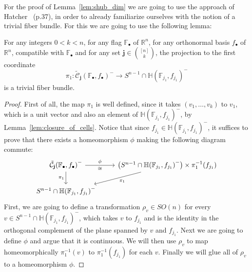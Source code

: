 For the proof of Lemma~\ref{lem:shub_dim} we are going to use the approach of Hatcher~\cite{vec_bundles} (p.37), in order to already familiarize ourselves with the notion of a trivial fiber bundle. For this we are going to use the following lemma:
\begin{lemma}\label{lem:trivial_fb} For any integers $0<k<n$, for any flag $\mathbb{F}_{\bullet}$ of $\mathbb{R}^n$, for any orthonormal basis $f_{\bullet}$ of $\mathbb{R}^n$, compatible with $\mathbb{F}_{\bullet}$ and for any set $\mathbf{j}\in\binom{[n]}{k}$, the projection to the first coordinate
\[\pi_1:\tilde{\mathcal{C}}_{\mathbf{j}}{\left(\mathbb{F}_{\bullet},f_{\bullet}\right)}^-\to S^{n-1}\cap\mathbb{H}{\left(\mathbb{F}_{j_1},f_{j_1}\right)}^-\]
is a trivial fiber bundle.
\end{lemma}
\begin{proof} First of all, the map $\pi_1$ is well defined, since it takes $(v_1,\ldots,v_k)$ to $v_1$, which is a unit vector and also an element of $\mathbb{H}{\left(\mathbb{F}_{j_1},f_{j_1}\right)}^-$, by Lemma~\ref{lem:closure_of_cells}. Notice that since $f_{j_1}\in\mathbb{H}{\left(\mathbb{F}_{j_1},f_{j_1}\right)}^-$, it suffices to prove that there exists a homeomorphism $\phi$ making the following diagram commute:
\begin{equation}\label{eq:phi_for_trivial}
\begin{tikzcd}
\tilde{\mathcal{C}}_{\mathbf{j}}{\left(\mathbb{F}_{\bullet},f_{\bullet}\right)}^-\ar[r,"\phi","\cong"']\ar[d,"\pi_1"']&\big(S^{n-1}\cap\mathbb{H}{\left(\mathbb{F}_{j_1},f_{j_1}\right)}^-\big)\times\pi_1^{-1}(f_{j_1})\ar[dl,"\pi_1"]\\
S^{n-1}\cap\mathbb{H}{\left(\mathbb{F}_{j_1},f_{j_1}\right)}^-
\end{tikzcd}
\end{equation}
First, we are going to define a transformation $\rho_{v}\in SO(n)$ for every $v\in S^{n-1}\cap\mathbb{H}{\left(\mathbb{F}_{j_1},f_{j_1}\right)}^-$, which takes $v$ to $f_{j_1}$ and is the identity in the orthogonal complement of the plane spanned by $v$ and $f_{j_1}$. Next we are going to define $\phi$ and argue that it is continuous. We will then use $\rho_{v}$ to map homeomorphically $\pi_1^{-1}(v)$ to $\pi_1^{-1}(f_{j_1})$ for each $v$. Finally we will glue all of $\rho_v$ to a homeomorphism $\phi$.


\end{proof}
